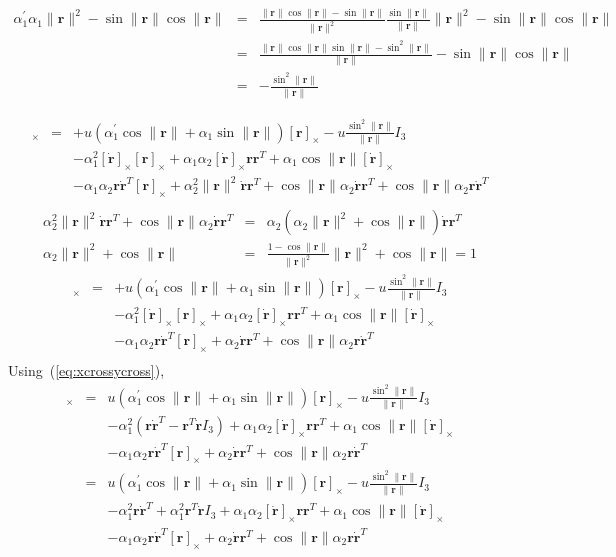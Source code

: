 \documentclass {article}
\newcommand\rot{\mathbf{r}}
\newcommand\rcross{[\rot]_{\times}}
\newcommand\omegacross{[\omega]_{\times}}
\newcommand\rdotcross{\left[\dot{\rot}\right]_{\times}}
\newcommand\normr{\|\rot\|}
\newcommand\alphap{\alpha^{\prime}}
\begin{document}
\begin{eqnarray*}
\alphap_1\alpha_1\normr^2 - \sin\normr\cos\normr &=&
\frac{\normr \cos \normr - \sin \normr}{\normr^2}\frac{\sin \normr}{\normr}\normr^2- \sin\normr\cos\normr\\
&=&
\frac{\normr\cos\normr\sin\normr - \sin^2\normr}{\normr}- \sin\normr\cos\normr\\&=&-\frac{\sin^2\normr}{\normr}
\end{eqnarray*}

\begin{eqnarray*}
\omegacross &=&
+ u\left(\alphap_1 \cos\normr + \alpha_1\sin\normr\right) \rcross -u \frac{\sin^2\normr}{\normr} I_3\\
&& -\alpha_1^2 \rdotcross\rcross + \alpha_1 \alpha_2 \rdotcross\rot\rot^T + \alpha_1\cos\normr\rdotcross\\
&&- \alpha_1 \alpha_2 \rot\dot{\rot}^T\rcross +  \alpha_2^2\normr^2\dot{\rot}\rot^T + \cos\normr\alpha_2\dot{\rot}\rot^T + \cos\normr\alpha_2\rot\dot{\rot}^T\\
\end{eqnarray*}
\begin{eqnarray*}
\alpha_2^2\normr^2\dot{\rot}\rot^T + \cos\normr\alpha_2\dot{\rot}\rot^T &=&
\alpha_2\left(\alpha_2\normr^2 + \cos\normr\right)\dot{\rot}\rot^T\\
\alpha_2\normr^2 + \cos\normr &=& \frac{1 - \cos \normr}{\normr^2}\normr^2 + \cos\normr = 1
\end{eqnarray*}
\begin{eqnarray*}
\omegacross &=&
+ u\left(\alphap_1 \cos\normr + \alpha_1\sin\normr\right) \rcross -u \frac{\sin^2\normr}{\normr} I_3\\
&& -\alpha_1^2 \rdotcross\rcross + \alpha_1 \alpha_2 \rdotcross\rot\rot^T + \alpha_1\cos\normr\rdotcross\\
&&- \alpha_1 \alpha_2 \rot\dot{\rot}^T\rcross + \alpha_2\dot{\rot}\rot^T + \cos\normr\alpha_2\rot\dot{\rot}^T\\
\end{eqnarray*}
Using~(\ref{eq:xcrossycross}),
\begin{eqnarray*}
\omegacross &=&
u\left(\alphap_1 \cos\normr + \alpha_1\sin\normr\right) \rcross -u \frac{\sin^2\normr}{\normr} I_3\\
&& -\alpha_1^2 (\rot\dot{\rot}^T-\rot^T\dot{\rot} I_3) + \alpha_1 \alpha_2 \rdotcross\rot\rot^T + \alpha_1\cos\normr\rdotcross\\
&&- \alpha_1 \alpha_2 \rot\dot{\rot}^T\rcross + \alpha_2\dot{\rot}\rot^T + \cos\normr\alpha_2\rot\dot{\rot}^T\\
&=& u\left(\alphap_1 \cos\normr + \alpha_1\sin\normr\right) \rcross -u \frac{\sin^2\normr}{\normr} I_3\\
&& -\alpha_1^2\rot\dot{\rot}^T+\alpha_1^2\rot^T\dot{\rot} I_3 + \alpha_1 \alpha_2 \rdotcross\rot\rot^T + \alpha_1\cos\normr\rdotcross\\
&&- \alpha_1 \alpha_2 \rot\dot{\rot}^T\rcross + \alpha_2\dot{\rot}\rot^T + \cos\normr\alpha_2\rot\dot{\rot}^T\\
\end{eqnarray*}
\end{document}
